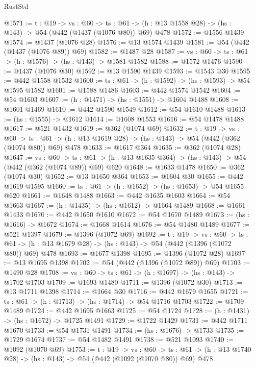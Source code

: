 \begin{lexlean}{RustStd}
\begin{coremodule}
@1571 := {t : @19} ->
  {vs : @60} ->
  {ts : @61} -> (h : @13 @1558 @28) -> (hs : @143) -> @54 (@442 (@1437 (@1076 @80)) @69) @478
@1572 := @1556 @1439
@1574 := @1437 (@1076 @28)
@1576 := @13 @1574 @1439
@1581 := @54 (@442 (@1437 (@1076 @89)) @69)
@1582 := @1487 @28
@1587 := {vs : @60} -> {ts : @61} -> (h : @1576) -> (hs : @143) -> @1581 @1582
@1588 := @1572 @1476
@1590 := @1437 (@1076 @30)
@1592 := @13 @1590 @1439
@1593 := @1543 @30
@1595 := @442 @1558 @1532
@1600 := {ts : @61} -> (h : @1592) -> (hs : @1593) -> @54 @1595 @1582
@1601 := @1588 @1486
@1603 := @442 @1574 @1542
@1604 := @54 @1603
@1607 := (h : @1471) -> (hs : @1551) -> @1604 @1488
@1608 := @1601 @1469
@1610 := @442 @1590 @1549
@1612 := @54 @1610 @1488
@1613 := (hs : @1555) -> @1612
@1614 := @1608 @1553
@1616 := @54 @1478 @1488
@1617 := @521 @1432
@1619 := @362 (@1074 @69)
@1632 := {t : @19} ->
  {vs : @60} ->
  {ts : @61} -> (h : @13 @1619 @28) -> (hs : @143) -> @54 (@442 (@362 (@1074 @80)) @69) @478
@1633 := @1617 @364
@1635 := @362 (@1074 @28)
@1647 := {vs : @60} ->
  {ts : @61} -> (h : @13 @1635 @364) -> (hs : @143) -> @54 (@442 (@362 (@1074 @89)) @69) @620
@1648 := @1633 @1478
@1650 := @362 (@1074 @30)
@1652 := @13 @1650 @364
@1653 := @1604 @30
@1655 := @442 @1619 @1595
@1660 := {ts : @61} -> (h : @1652) -> (hs : @1653) -> @54 @1655 @620
@1661 := @1648 @1488
@1663 := @442 @1635 @1603
@1664 := @54 @1663
@1667 := (h : @1435) -> (hs : @1612) -> @1664 @1489
@1668 := @1661 @1433
@1670 := @442 @1650 @1610
@1672 := @54 @1670 @1489
@1673 := (hs : @1616) -> @1672
@1674 := @1668 @1614
@1676 := @54 @1480 @1489
@1677 := @521 @1397
@1679 := @1396 (@1072 @69)
@1692 := {t : @19} ->
  {vs : @60} ->
  {ts : @61} -> (h : @13 @1679 @28) -> (hs : @143) -> @54 (@442 (@1396 (@1072 @80)) @69) @478
@1693 := @1677 @1398
@1695 := @1396 (@1072 @28)
@1697 := @13 @1695 @1398
@1702 := @54 (@442 (@1396 (@1072 @89)) @69)
@1703 := @1490 @28
@1708 := {vs : @60} -> {ts : @61} -> (h : @1697) -> (hs : @143) -> @1702 @1703
@1709 := @1693 @1480
@1711 := @1396 (@1072 @30)
@1713 := @13 @1711 @1398
@1714 := @1664 @30
@1716 := @442 @1679 @1655
@1721 := {ts : @61} -> (h : @1713) -> (hs : @1714) -> @54 @1716 @1703
@1722 := @1709 @1489
@1724 := @442 @1695 @1663
@1725 := @54 @1724
@1728 := (h : @1431) -> (hs : @1672) -> @1725 @1491
@1729 := @1722 @1429
@1731 := @442 @1711 @1670
@1733 := @54 @1731 @1491
@1734 := (hs : @1676) -> @1733
@1735 := @1729 @1674
@1737 := @54 @1482 @1491
@1738 := @521 @1093
@1740 := @1092 (@1070 @69)
@1753 := {t : @19} ->
  {vs : @60} ->
  {ts : @61} -> (h : @13 @1740 @28) -> (hs : @143) -> @54 (@442 (@1092 (@1070 @80)) @69) @478

\end{coremodule}
\end{lexlean}
